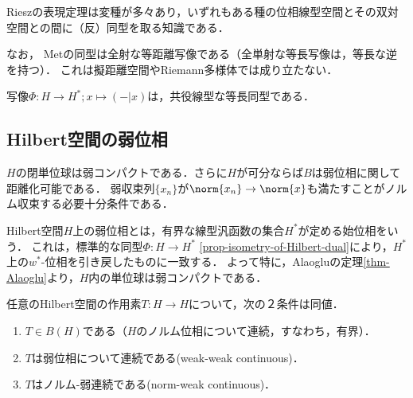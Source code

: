 \documentclass[uplatex,dvipdfmx]{jsreport}
\begin{document}
\begin{tcolorbox}[colframe=ForestGreen, colback=ForestGreen!10!white,breakable,colbacktitle=ForestGreen!40!white,coltitle=black,fonttitle=\bfseries\sffamily,
title=]
    Rieszの表現定理は変種が多々あり，いずれもある種の位相線型空間とその双対空間との間に（反）同型を取る知識である．

    なお，
    Metの同型は全射な等距離写像である（全単射な等長写像は，等長な逆を持つ）．
    これは擬距離空間やRiemann多様体では成り立たない．
\end{tcolorbox}

\begin{proposition}\label{prop-isometry-of-Hilbert-dual}
    写像$\Phi:H\to H^*;x\mapsto(-|x)$は，共役線型な等長同型である．
\end{proposition}

\subsection{Hilbert空間の弱位相}

\begin{tcolorbox}[colframe=ForestGreen, colback=ForestGreen!10!white,breakable,colbacktitle=ForestGreen!40!white,coltitle=black,fonttitle=\bfseries\sffamily,
title=]
    $H$の閉単位球は弱コンパクトである．さらに$H$が可分ならば$B$は弱位相に関して距離化可能である．
    弱収束列$\{x_n\}$が$\norm{x_n}\to\norm{x}$も満たすことがノルム収束する必要十分条件である．
\end{tcolorbox}

\begin{definition}\label{def-weak-topology-on-H(B)}
    Hilbert空間$H$上の弱位相とは，有界な線型汎函数の集合$H^*$が定める始位相をいう．
    これは，標準的な同型$\Phi:H\to H^*$ \ref{prop-isometry-of-Hilbert-dual}により，$H^*$上の$w^*$-位相を引き戻したものに一致する．
    よって特に，Alaogluの定理\ref{thm-Alaoglu}より，$H$内の単位球は弱コンパクトである．
\end{definition}

\begin{proposition}[Hilbert空間上の有界線型作用素の特徴付け]\label{lemma-characterization-of-bounded-operator-on-Hilbert-space}
    任意のHilbert空間の作用素$T:H\to H$について，次の２条件は同値．
    \begin{enumerate}
        \item $T\in B(H)$である（$H$のノルム位相について連続，すなわち，有界）．
        \item $T$は弱位相について連続である(weak-weak continuous)．
        \item $T$はノルム-弱連続である(norm-weak continuous)．
    \end{enumerate}
\end{proposition}
\end{document}
